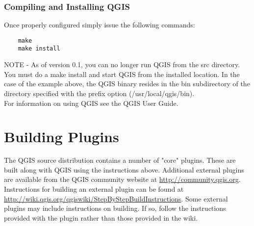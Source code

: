 \documentclass[a4paper,10pt]{article}
\begin{document}
  \subsubsection{Compiling and Installing QGIS}
  Once properly configured simply issue the following commands:
  \begin{verbatim}
    make
    make install
  \end{verbatim}
NOTE - As of version 0.1, you can no longer run QGIS from the src directory. You must do a make install and start QGIS from the installed location. In the case of the example above, the QGIS binary resides in the bin subdirectory of the directory specified with the prefix option (/usr/local/qgis/bin).\\

For information on using QGIS see the QGIS User Guide.

\section{Building Plugins}
The QGIS source distribution contains a number of "core" plugins. These are built along with QGIS using the instructions above. Additional external plugins are available from the QGIS community website at \url{http://community.qgis.org}. Instructions for building an external plugin can be found at \url{http://wiki.qgis.org/qgiswiki/StepByStepBuildInstructions}. Some external plugins may include instructions on building. If so, follow the instructions provided with the plugin rather than those provided in the wiki. 
  
\end{document}
